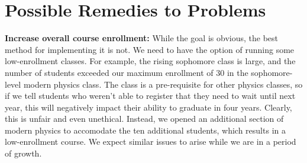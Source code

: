 \documentclass[12pt]{article}
\begin{document}














\section{Possible Remedies to Problems}
\vspace*{-.2in}
{\bf Increase overall course enrollment:}
While the goal is obvious, the best method for implementing it is not.  We need to have the option of running some low-enrollment classes.  For example, the rising sophomore class is large, and the number of students exceeded our maximum enrollment of 30 in the sophomore-level modern physics class.  The class is a pre-requisite for other physics classes, so if we tell students who weren't able to register that they need to wait until next year, this will negatively impact their ability to graduate in four years.  Clearly, this is unfair and even unethical.  Instead, we opened an additional section of modern physics to accomodate the ten additional students, which results in a low-enrollment course.  We expect similar issues to arise while we are in a period of growth.  
\end{document}
